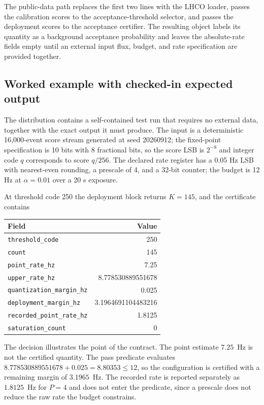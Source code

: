 \documentclass[preprint,12pt]{elsarticle}
\begin{document}
The public-data path replaces the first two lines with the LHCO loader, passes
the calibration scores to the acceptance-threshold selector, and passes the
deployment scores to the acceptance certifier.  The resulting object labels
its quantity as a background acceptance probability and leaves the absolute-rate
fields empty until an external input flux, budget, and rate specification are
provided together.

\subsection{Worked example with checked-in expected output}
\label{sec:worked}

The distribution contains a self-contained test run that requires no external
data, together with the exact output it must produce.  The input is a
deterministic 16{,}000-event score stream generated at seed 20260912; the
fixed-point specification is 10 bits with 8 fractional bits, so the score LSB is
$2^{-8}$ and integer code $q$ corresponds to score $q/256$.  The declared rate
register has a 0.05 Hz LSB with nearest-even rounding, a prescale of 4, and a
32-bit counter; the budget is 12 Hz at $\alpha=0.01$ over a 20 s exposure.

At threshold code 250 the deployment block returns $K=145$, and the certificate
contains
\begin{center}\small
\begin{tabular}{@{}lr@{}}
\toprule
Field & Value \\
\midrule
\texttt{threshold\_code} & 250 \\
\texttt{count} & 145 \\
\texttt{point\_rate\_hz} & 7.25 \\
\texttt{upper\_rate\_hz} & 8.778530889551678 \\
\texttt{quantization\_margin\_hz} & 0.025 \\
\texttt{deployment\_margin\_hz} & 3.1964691104483216 \\
\texttt{recorded\_point\_rate\_hz} & 1.8125 \\
\texttt{saturation\_count} & 0 \\
\bottomrule
\end{tabular}
\end{center}
The decision illustrates the point of the contract.  The point estimate
$7.25$~Hz is not the certified quantity.  The pass predicate evaluates
$8.778530889551678 + 0.025 = 8.80353 \le 12$, so the configuration is certified
with a remaining margin of $3.1965$~Hz.  The recorded rate is reported
separately as $1.8125$~Hz for $P=4$ and does not enter the predicate, since a
prescale does not reduce the raw rate the budget constrains.
\end{document}

